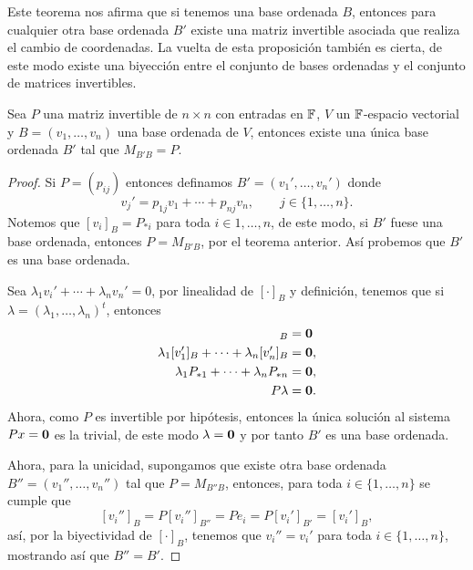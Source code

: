 Este teorema nos afirma que si tenemos una base ordenada $B$, entonces para cualquier otra base ordenada $B'$ existe una matriz invertible asociada que realiza el cambio de coordenadas. La vuelta de esta proposición también es cierta, de este modo existe una biyección entre el conjunto de bases ordenadas y el conjunto de matrices invertibles.

\begin{prop}\label{prop:ExBase}
  Sea $P$ una matriz invertible de $n\times n$ con entradas en $\mathbb{F}$, $V$ un $\mathbb{F}$-espacio vectorial y $B = (v_1, \ldots, v_n)$ una base ordenada de $V$, entonces existe una única base ordenada $B'$ tal que $M_{B'B} = P$.
\end{prop}
\begin{proof}
  Si $P = (p_{ij})$ entonces definamos $B' = (v_1', \ldots, v_n')$ donde
    \[ v_j' = p_{1j}v_1 + \cdots +  p_{nj}v_n,     \qquad j \in \{1,\ldots, n\}. \]
  Notemos que $[v_i]_B = P_{*i}$ para toda $i \in 1,\ldots,n$, de este modo, si $B'$ fuese una base ordenada, entonces $P = M_{B'B}$, por el teorema anterior. Así probemos que $B'$ es una base ordenada.

  Sea $\lambda_1 v_i' + \cdots + \lambda_n v_n' = 0$, por linealidad de $[\cdot]_B$ y definición, tenemos que si $\lambda = (\lambda_1, \ldots, \lambda_n)^t$, entonces
  \begin{align*}
    [\lambda_1 v_i' + \cdots + \lambda_n v_n']_B &= \bec 0 \\
    \lambda_1 [v_1']_B + \cdots + \lambda_n [v_n']_B &= \bec 0 ,\\
    \lambda_1 P_{*1} + \cdots + \lambda_n P_{*n} &= \bec 0 ,\\
    P\lambda &= \bec 0.
  \end{align*}
  Ahora, como $P$ es invertible por hipótesis, entonces la única solución al sistema $Px = \mathbf{0}$ es la trivial, de este modo $\lambda = \mathbf{0}$ y por tanto $B'$ es una base ordenada.

  Ahora, para la unicidad, supongamos que existe otra base ordenada $B'' = (v_1'', \ldots, v_n'')$ tal que $P = M_{B''B}$, entonces, para toda $i \in \{1,\ldots,n\}$ se cumple que
  \[ [v_i'']_B =  P[v_i'']_{B''} = Pe_i = P[v_i']_{B'} = [v_i']_B, \]
  así, por la biyectividad de $[\cdot]_B$, tenemos que $v_i'' = v_i'$ para toda $i \in \{1,\ldots,n\}$, mostrando así que $B'' = B'$.
\end{proof}

